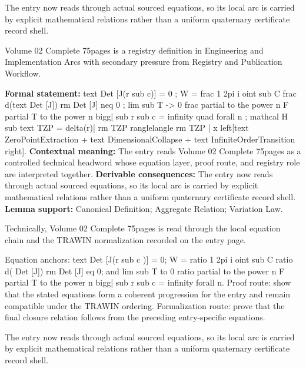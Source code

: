 The entry now reads through actual sourced equations, so its local arc is carried by explicit mathematical relations rather than a uniform quaternary certificate record shell.
\clearpage


\begingroup\small
{}
Volume 02 Complete 75pages is a registry definition in Engineering and Implementation Arcs with secondary pressure from Registry and Publication Workflow.

\begingroup\footnotesize\setlength{\emergencystretch}{3em}\sloppy
\textbf{Formal statement:} text Det [J(r sub c)] = 0 ; W = frac 1 2pi i oint sub C frac d(text Det [J]) rm Det [J] neq 0 ; lim sub T -> 0 frac partial to the power n F partial T to the power n bigg| sub r sub c = infinity quad forall n ; mathcal H sub text TZP = delta(r)| rm TZP ranglelangle rm TZP | x left[text ZeroPointExtraction + text DimensionalCollapse + text InfiniteOrderTransition right]. \textbf{Contextual meaning:} The entry reads Volume 02 Complete 75pages as a controlled technical headword whose equation layer, proof route, and registry role are interpreted together. \textbf{Derivable consequences:} The entry now reads through actual sourced equations, so its local arc is carried by explicit mathematical relations rather than a uniform quaternary certificate record shell. \textbf{Lemma support:} Canonical Definition; Aggregate Relation; Variation Law.\par
\endgroup

Technically, Volume 02 Complete 75pages is read through the local equation chain and the TRAWIN normalization recorded on the entry page.

Equation anchors: text Det [J(r sub c )] = 0; W = ratio 1 2pi i oint sub C ratio d( Det [J]) rm Det [J] eq 0; and lim sub T to 0 ratio partial to the power n F partial T to the power n bigg| sub r sub c = infinity forall n. Proof route: show that the stated equations form a coherent progression for the entry and remain compatible under the TRAWIN ordering. Formalization route: prove that the final closure relation follows from the preceding entry-specific equations.

The entry now reads through actual sourced equations, so its local arc is carried by explicit mathematical relations rather than a uniform quaternary certificate record shell.
\endgroup

